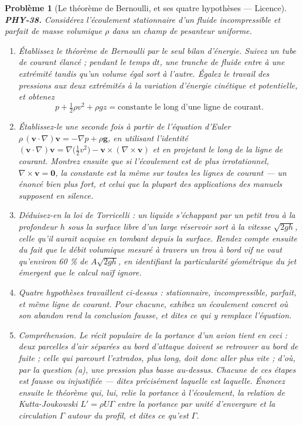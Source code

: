 \documentclass[11pt]{article}
\newtheorem{problem}{Problème}
\begin{document}
\begin{problem}[{Le théorème de Bernoulli, et ses quatre hypothèses --- Licence}]
\textbf{PHY-38.} Considérez l'écoulement stationnaire d'un fluide incompressible et parfait de
masse volumique $ \rho $ dans un champ de pesanteur uniforme.
\begin{enumerate}
\item[(a)] Établissez le théorème de Bernoulli par le seul bilan d'énergie. Suivez un tube de courant
élancé ; pendant le temps $ dt $, une tranche de fluide entre à une extrémité tandis qu'un
volume égal sort à l'autre. Égalez le travail des pressions aux deux extrémités à la variation
d'énergie cinétique et potentielle, et obtenez
\[ p + \tfrac{1}{2}\rho v^{2} + \rho g z = \text{constante le long d'une ligne de courant}. \]
\item[(b)] Établissez-le une seconde fois à partir de l'équation d'Euler
$ \rho\,(\mathbf{v}\cdot\nabla)\mathbf{v} = -\nabla p + \rho \mathbf{g} $, en utilisant
l'identité
$ (\mathbf{v}\cdot\nabla)\mathbf{v} = \nabla\bigl(\tfrac12 v^{2}\bigr) - \mathbf{v}\times(\nabla\times\mathbf{v}) $
et en projetant le long de la ligne de courant. Montrez ensuite que si l'écoulement est de plus
irrotationnel, $ \nabla\times\mathbf{v} = \mathbf{0} $, la constante est la même sur
\textit{toutes} les lignes de courant --- un énoncé bien plus fort, et celui que la plupart des
applications des manuels supposent en silence.
\item[(c)] Déduisez-en la loi de Torricelli : un liquide s'échappant par un petit trou à la profondeur
$ h $ sous la surface libre d'un large réservoir sort à la vitesse $ \sqrt{2gh} $, celle
qu'il aurait acquise en tombant depuis la surface. Rendez compte ensuite du fait que le débit
volumique mesuré à travers un trou à bord vif ne vaut qu'environ 60 \% de $ A\sqrt{2gh} $, en
identifiant la particularité géométrique du jet émergent que le calcul naïf ignore.
\item[(d)] Quatre hypothèses travaillent ci-dessus : stationnaire, incompressible, parfait, et même
ligne de courant. Pour chacune, exhibez un écoulement concret où son abandon rend la conclusion
fausse, et dites ce qui y remplace l'équation.
\item[(e)] Compréhension. Le récit populaire de la portance d'un avion tient en ceci : deux parcelles
d'air séparées au bord d'attaque doivent se retrouver au bord de fuite ; celle qui parcourt
l'extrados, plus long, doit donc aller plus vite ; d'où, par la question (a), une pression plus
basse au-dessus. Chacune de ces étapes est fausse ou injustifiée --- dites précisément laquelle est
laquelle. Énoncez ensuite le théorème qui, lui, relie la portance à l'écoulement, la relation de
Kutta-Joukowski $ L' = \rho U \Gamma $ entre la portance par unité d'envergure et la
circulation $ \Gamma $ autour du profil, et dites ce qu'est $ \Gamma $.
\end{enumerate}

\end{problem}
\end{document}
